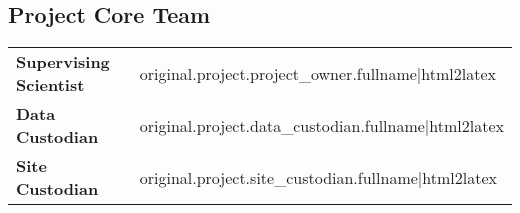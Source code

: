 \subsection*{Project Core Team}
\begin{tabu} {X X}
\textbf{Supervising Scientist} & {{ original.project.project_owner.fullname|html2latex }}\\
\textbf{Data Custodian} & {{ original.project.data_custodian.fullname|html2latex }}\\
\textbf{Site Custodian} & {{ original.project.site_custodian.fullname|html2latex }}\\
\end{tabu}


